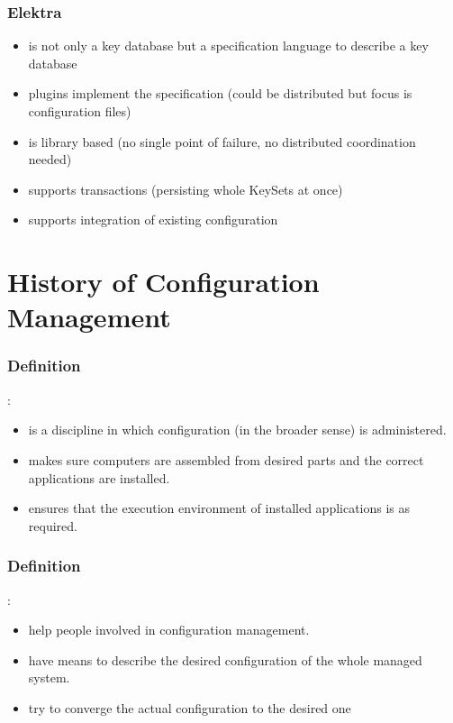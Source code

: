 \begin{frame}
	\frametitle{Elektra}

	\begin{itemize}
	\item is not only a key database but a specification language to describe a key database
	\item plugins implement the specification (could be distributed but focus is configuration files)
	\item is library based (no single point of failure, no distributed coordination needed)
	\item supports transactions (persisting whole KeySets at once)
	\item supports integration of existing configuration
	\end{itemize}
\end{frame}



\section{History of Configuration Management}

\begin{frame}
	\frametitle{Definition}

	:

	\begin{itemize}
	\item is a discipline in which configuration (in the broader sense) is administered.
	\item makes sure computers are assembled from desired parts and the correct applications are installed.
	\item ensures that the execution environment of installed applications is as required.%
	\end{itemize}
\end{frame}


\begin{frame}
	\frametitle{Definition}

	:

	\pause

	\begin{itemize}
	\item help people involved in configuration management.
	\item have means to describe the desired configuration of the whole managed system.
	\item try to converge the actual configuration to the desired one~\cite{burgess1995cfengine}
	\end{itemize}
\end{frame}


